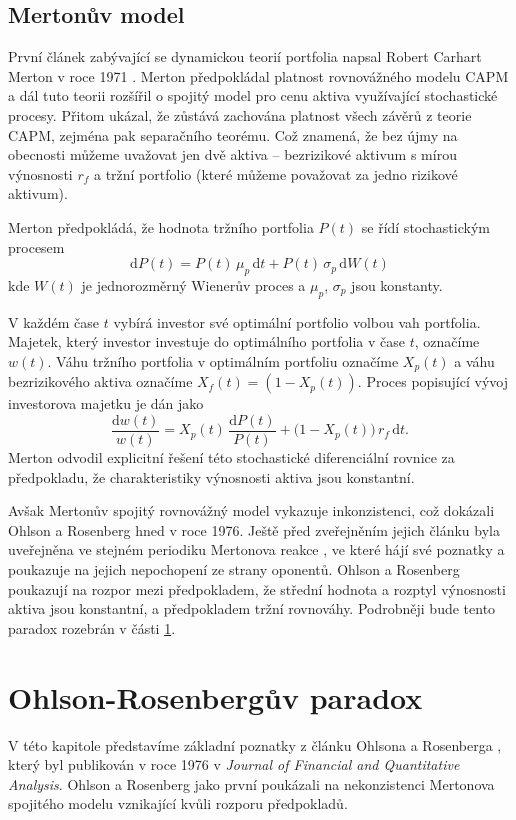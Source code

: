 \documentclass[a4paper,12pt]{report}
\theoremstyle{definition} \newtheorem{definice}[veta]{Definice}
\theoremstyle{remark}
\begin{document}
\subsection{Mertonův model}
První článek zabývající se dynamickou teorií portfolia napsal Robert Carhart Merton v roce 1971 \cite{merton1971}.
Merton předpokládal platnost rovnovážného modelu CAPM a dál tuto teorii rozšířil o spojitý model pro cenu aktiva využívající stochastické procesy.
Přitom ukázal, že zůstává zachována platnost všech závěrů z teorie CAPM, zejména pak separačního teorému.
Což znamená, že bez újmy na obecnosti můžeme uvažovat jen dvě aktiva -- bezrizikové aktivum s mírou výnosnosti $r_f$ a tržní portfolio (které můžeme považovat za jedno rizikové aktivum). 

Merton předpokládá, že hodnota tržního portfolia $P(t)$ se řídí stochastickým procesem
$$\mathrm{d}P(t)=P(t)\,\mu_p\,\mathrm{d}t+P(t)\,\sigma_p\,\mathrm{d}W(t)$$
kde $W(t)$ je jednorozměrný Wienerův proces a $\mu_p$, $\sigma_p$ jsou konstanty. 

V každém čase $t$ vybírá investor své optimální portfolio volbou vah portfolia.
Majetek, který investor investuje do optimálního portfolia v čase $t$, označíme $w(t)$.
Váhu tržního portfolia v optimálním portfoliu označíme $X_p(t)$ a váhu bezrizikového aktiva označíme $X_f(t)=(1-X_p(t))$. 
Proces popisující vývoj investorova majetku je dán jako
$$\frac{\mathrm{d}w(t)}{w(t)}=X_p(t)\,\frac{\mathrm{d}P(t)}{P(t)}+\big(1-X_p(t)\big)\,r_f\,\mathrm{d}t.$$
Merton odvodil explicitní řešení této stochastické diferenciální rovnice za předpokladu, že charakteristiky výnosnosti aktiva jsou konstantní.

Avšak Mertonův spojitý rovnovážný model vykazuje inkonzistenci, což dokázali Ohlson a Rosenberg \cite{ohlson} hned v roce 1976.
Ještě před zveřejněním jejich článku byla uveřejněna ve stejném periodiku Mertonova reakce \cite{merton1975}, ve které hájí své poznatky a poukazuje na jejich nepochopení ze strany oponentů.  
Ohlson a Rosenberg \cite {ohlson} poukazují na rozpor mezi předpokladem, že střední hodnota a rozptyl výnosnosti aktiva jsou konstantní, a předpokladem tržní rovnováhy.
Podrobněji bude tento paradox rozebrán v části \ref{paradox}.


\section{Ohlson-Rosenbergův paradox}\label{paradox}
V této kapitole představíme základní poznatky z článku Ohlsona a Rosenberga \cite{ohlson}, který byl publikován v roce 1976 v \textit{Journal of Financial and Quantitative Analysis}.
Ohlson a Rosenberg jako první poukázali na nekonzistenci Mertonova spojitého modelu \cite{merton1971} vznikající kvůli rozporu předpokladů.
\end{document}
